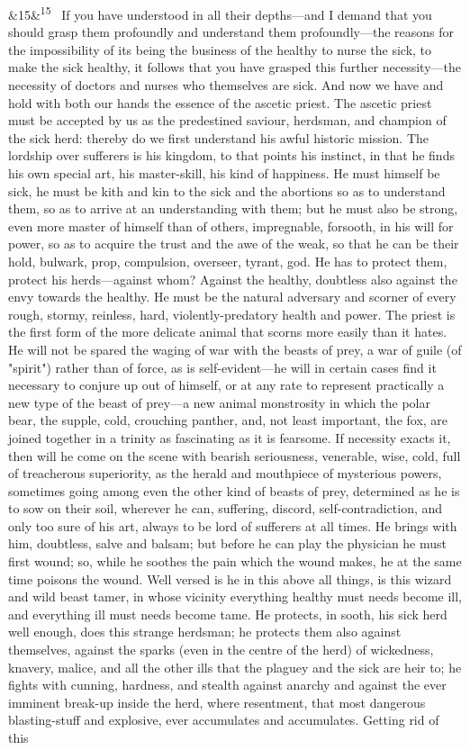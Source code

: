 \documentclass[12pt]{article}
\newcommand{\para}[1][]{\par\noindent\ifx&#1&\else\textsuperscript{\footnotesize #1}~\fi}
\begin{document}
\para[15] If you have understood in all their depths---and I demand that you should grasp them profoundly and understand them profoundly---the reasons for the impossibility of its being the business of the healthy to nurse the sick, to make the sick healthy, it follows that you have grasped this further necessity---the necessity of doctors and nurses who themselves are sick. And now we have and hold with both our hands the essence of the ascetic priest. The ascetic priest must be accepted by us as the predestined saviour, herdsman, and champion of the sick herd: thereby do we first understand his awful historic mission. The lordship over sufferers is his kingdom, to that points his instinct, in that he finds his own special art, his master-skill, his kind of happiness. He must himself be sick, he must be kith and kin to the sick and the abortions so as to understand them, so as to arrive at an understanding with them; but he must also be strong, even more master of himself than of others, impregnable, forsooth, in his will for power, so as to acquire the trust and the awe of the weak, so that he can be their hold, bulwark, prop, compulsion, overseer, tyrant, god. He has to protect them, protect his herds---against whom? Against the healthy, doubtless also against the envy towards the healthy. He must be the natural adversary and scorner of every rough, stormy, reinless, hard, violently-predatory health and power. The priest is the first form of the more delicate animal that scorns more easily than it hates. He will not be spared the waging of war with the beasts of prey, a war of guile (of "spirit") rather than of force, as is self-evident---he will in certain cases find it necessary to conjure up out of himself, or at any rate to represent practically a new type of the beast of prey---a new animal monstrosity in which the polar bear, the supple, cold, crouching panther, and, not least important, the fox, are joined together in a trinity as fascinating as it is fearsome. If necessity exacts it, then will he come on the scene with bearish seriousness, venerable, wise, cold, full of treacherous superiority, as the herald and mouthpiece of mysterious powers, sometimes going among even the other kind of beasts of prey, determined as he is to sow on their soil, wherever he can, suffering, discord, self-contradiction, and only too sure of his art, always to be lord of sufferers at all times. He brings with him, doubtless, salve and balsam; but before he can play the physician he must first wound; so, while he soothes the pain which the wound makes, he at the same time poisons the wound. Well versed is he in this above all things, is this wizard and wild beast tamer, in whose vicinity everything healthy must needs become ill, and everything ill must needs become tame. He protects, in sooth, his sick herd well enough, does this strange herdsman; he protects them also against themselves, against the sparks (even in the centre of the herd) of wickedness, knavery, malice, and all the other ills that the plaguey and the sick are heir to; he fights with cunning, hardness, and stealth against anarchy and against the ever imminent break-up inside the herd, where resentment, that most dangerous blasting-stuff and explosive, ever accumulates and accumulates. Getting rid of this 
\end{document}
